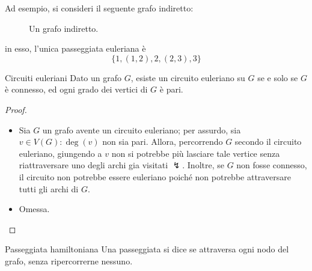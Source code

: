 \documentclass[a4paper, 12pt]{report}
\begin{document}
    \begin{example}
        Ad esempio, si consideri il seguente grafo indiretto:

        \begin{figure}[H]
            \centering
            \caption{Un grafo indiretto.}
        \end{figure}

        in esso, l'unica passeggiata euleriana è $$\{1, (1,2), 2, (2,3), 3\}$$
    \end{example}

    \begin{framedthm}{Circuiti euleriani}
        Dato un grafo $G$, esiste un circuito euleriano su $G$ se e solo se $G$ è connesso, ed ogni grado dei vertici di $G$ è pari.
    \end{framedthm}

    \begin{proof}
        \hspace{0.7cm}
        \begin{itemize}
            \item[]  Sia $G$ un grafo avente un circuito euleriano; per assurdo, sia $v \in V(G) : \deg(v)$ non sia pari. Allora, percorrendo $G$ secondo il circuito euleriano, giungendo a $v$ non si potrebbe più lasciare tale vertice senza riattraversare uno degli archi gia visitati $\lightning$. Inoltre, se $G$ non fosse connesso, il circuito non potrebbe essere euleriano poiché non potrebbe attraversare tutti gli archi di $G$.
            \item[]  Omessa.
        \end{itemize}
    \end{proof}

    \begin{frameddefn}{Passeggiata hamiltoniana}
        Una passeggiata si dice  se attraversa ogni nodo del grafo, senza ripercorrerne nessuno.
    \end{frameddefn}
\end{document}
